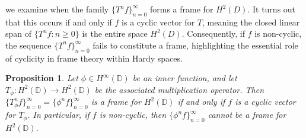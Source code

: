 \documentclass[12pt,titlepage]{amsart}
\newtheorem{prop}[thm]{Proposition}
\theoremstyle{definition}
\theoremstyle{remark}
\begin{document}
we examine when the family $\{T^n f\}_{n=0}^\infty$ forms a frame
for $H^2(D)$. It turns out that this occurs if and only if $f$ is
a cyclic vector for $T$, meaning the closed linear span of $\{T^n
f : n \geq 0\}$ is the entire space $H^2(D)$. Consequently, if $f$
is non-cyclic, the sequence $\{T^n f\}_{n=0}^\infty$ fails to
constitute a frame, highlighting the essential role of cyclicity
in frame theory within Hardy spaces.
\begin{prop} \label{Prop.6}
Let $\phi \in H^{\infty}(\mathbb{D})$ be an inner function, and
let $T_{\phi}: H^2(\mathbb{D})\rightarrow H^2(\mathbb{D})$ be the
associated multiplication operator. Then
$\{T^n_{\phi}f\}_{n=0}^{\infty}=\{\phi^nf\}_{n=0}^{\infty}$ is a
frame for $H^2(\mathbb{D})$ if and only if $f$ is a cyclic vector
for $T_{\phi}$. In particular, if $f$ is non-cyclic, then
$\{\phi^n f\}_{n=0}^{\infty}$ cannot be a frame for
$H^2(\mathbb{D})$.
\end{prop}
\end{document}
